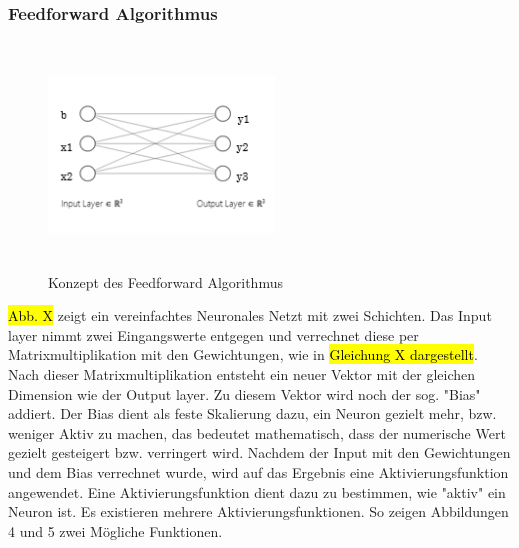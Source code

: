 \subsubsection{Feedforward Algorithmus}
\begin{figure}[H]
    \centering
    \includegraphics[height= 6cm, width = 6cm]{Pictures/FF.png}
    \caption{Konzept des Feedforward Algorithmus }
    
\end{figure}


\hl{Abb. X} zeigt ein vereinfachtes Neuronales Netzt mit zwei Schichten. Das Input layer nimmt zwei Eingangswerte entgegen und verrechnet diese per Matrixmultiplikation mit den Gewichtungen, wie in \hl{Gleichung X dargestellt}. Nach dieser Matrixmultiplikation entsteht ein neuer Vektor mit der gleichen Dimension wie der Output layer. Zu diesem Vektor wird noch der sog. "Bias" addiert. Der Bias dient als feste Skalierung dazu, ein Neuron gezielt mehr, bzw. weniger Aktiv zu machen, das bedeutet mathematisch, dass der numerische Wert gezielt gesteigert bzw. verringert wird. Nachdem der Input mit den Gewichtungen und dem Bias verrechnet wurde, wird auf das Ergebnis eine Aktivierungsfunktion angewendet. Eine Aktivierungsfunktion dient dazu zu bestimmen, wie "aktiv" ein Neuron ist. Es existieren mehrere Aktivierungsfunktionen. So zeigen Abbildungen 4 und 5 zwei Mögliche Funktionen. 

